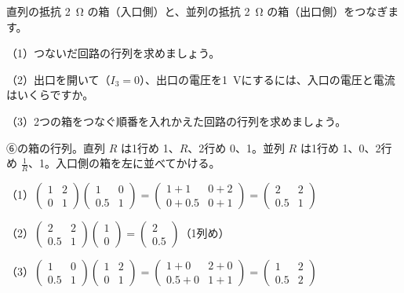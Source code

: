\begin{reidai}
直列の抵抗 \qty{2}{\ohm} の箱（入口側）と、並列の抵抗 \qty{2}{\ohm} の箱（出口側）をつなぎます。\par
（1）つないだ回路の行列を求めましょう。\par
（2）出口を開いて（$I_3=0$）、出口の電圧を\qty{1}{V}にするには、入口の電圧と電流はいくらですか。\par
（3）2つの箱をつなぐ順番を入れかえた回路の行列を求めましょう。\par
\kangaekata ⑥の箱の行列。直列 $R$ は1行め 1、$R$、2行め 0、1。並列 $R$ は1行め 1、0、2行め $\frac1R$、1。入口側の箱を左に並べてかける。\par
\shiki\kviids{}\zw{} （1）$\begin{pmatrix}1&2\\0&1\end{pmatrix}\begin{pmatrix}1&0\\0.5&1\end{pmatrix}=\begin{pmatrix}1+1&0+2\\0+0.5&0+1\end{pmatrix}=\begin{pmatrix}2&2\\0.5&1\end{pmatrix}$\par
\kviida （2）$\begin{pmatrix}2&2\\0.5&1\end{pmatrix}\begin{pmatrix}1\\0\end{pmatrix}=\begin{pmatrix}2\\0.5\end{pmatrix}$（1列め）\par
\kviida （3）$\begin{pmatrix}1&0\\0.5&1\end{pmatrix}\begin{pmatrix}1&2\\0&1\end{pmatrix}=\begin{pmatrix}1+0&2+0\\0.5+0&1+1\end{pmatrix}=\begin{pmatrix}1&2\\0.5&2\end{pmatrix}$\par

\end{reidai}
